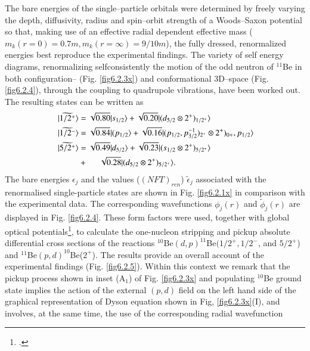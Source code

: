    
   
The bare energies of the single--particle orbitals were determined by freely varying the depth, diffusivity, radius and spin--orbit strength of a Woods--Saxon potential so that, making use of an effective radial dependent effective mass ($m_k(r=0)=0.7m, m_k(r=\infty)=9/10m$), the fully dressed, renormalized energies best reproduce the experimental findings.  The variety of self energy diagrams, renormalizing selfconsistently  
   the motion 
   of the odd neutron of $^{11}$Be in both configuration-- (Fig. \ref{fig6.2.3x}) 
   and conformational 3D--space (Fig. \ref{fig6.2.4}), through the coupling to quadrupole vibrations, have been worked out.
   The resulting states can be written as 
   \begin{align}
     \ |\widetilde{1/2^+} \rangle  &=  \sqrt{0.80} |s_{1/2}\rangle + \sqrt{0.20} |(d_{5/2}\otimes 2^+)_{1/2^+}\rangle    \\
     |\widetilde{1/2^-}\rangle &=  \sqrt{0.84} |(p_{1/2}\rangle + \sqrt{0.16} |(p_{1/2},p^{-1}_{3/2})_{2^+}
   \otimes 2^+)_{0+}, p_{1/2}\rangle \\
   |\widetilde{5/2^+}\rangle & =\sqrt{0.49} |d_{5/2}\rangle+ \sqrt{0.23}|(s_{1/2}\otimes 2^+)_{5/2^+} \rangle  \nonumber  \\
   & + \hspace{0.5cm}\sqrt{0.28} |(d_{5/2}\otimes 2^+)_{5/2^+} \rangle. 
   \end{align}  
   The  bare energies $\epsilon_j$ and the values ($(NFT)_{ren}$) $\tilde \epsilon_j$ 
   associated with the renormalised single-particle states 
   are shown in Fig. \ref{fig6.2.1x}   in comparison with the experimental 
   data. The corresponding wavefunctions $\phi_j(r)$ and $\tilde \phi_j(r)$
   are displayed in Fig. \ref{fig6.2.4}.
   These  form factors  were used,  
   together with  global optical  potentials\footnote{\cite{Han:06,Koning:03}.}, to calculate the one-nucleon stripping and pickup absolute differential 
   cross sections of the reactions $^{10}$Be$(d,p)^{11}$Be$(1/2^+,1/2^-$, and $5/2^+$) and $^{11}$Be$(p,d)^{10}$Be($2^+$). The results provide an overall account  of the experimental 
   findings  (Fig. \ref{fig6.2.5}). Within this context we remark that  the pickup process shown in inset
   (A$_1$) of Fig. \ref{fig6.2.3x} and populating $^{10}$Be ground state  implies the action of
   the external $(p,d)$ field on the left hand side of the graphical representation of Dyson equation shown in Fig, 
   \ref{fig6.2.3x}(I), and involves, at the same time, the use of the corresponding radial wavefunction
